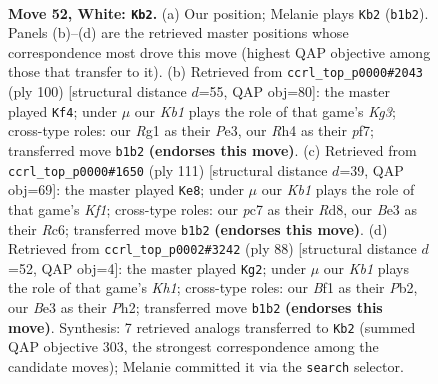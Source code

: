 \documentclass[11pt]{article}
\begin{document}
\clearpage

\begin{figure}[p]\centering
\begin{subfigure}{0.46\textwidth}\centering
\resizebox{\linewidth}{!}{%
\newchessgame
\chessboard[
  setfen={4n3/p1p1k3/8/5p2/r4P1R/4B3/7P/rK3BR1 w - - 8 52},
  showmover=false,
  pgfstyle=straightmove, color=movearrow, markmove={b1-b2}
]}
\caption{}
\end{subfigure}\hfill
\begin{subfigure}{0.46\textwidth}\centering
\resizebox{\linewidth}{!}{%
\newchessgame
\chessboard[
  setfen={1R5R/p4p2/5kp1/8/7P/4PPK1/6rr/8 w - - 5 51},
  showmover=false,
  pgfstyle=straightmove, color=movearrow, markmove={g3-f4}
]}
\caption{}
\end{subfigure}
\\[4pt]
\begin{subfigure}{0.46\textwidth}\centering
\resizebox{\linewidth}{!}{%
\newchessgame
\chessboard[
  setfen={3r1k2/5RR1/2r3pp/P5b1/4p3/6P1/4PPK1/8 b - - 4 56},
  showmover=false,
  pgfstyle=straightmove, color=movearrow, markmove={f8-e8}
]}
\caption{}
\end{subfigure}\hfill
\begin{subfigure}{0.46\textwidth}\centering
\resizebox{\linewidth}{!}{%
\newchessgame
\chessboard[
  setfen={3r4/8/3r4/5pk1/1pBn4/3R4/1P1R3P/7K w - - 2 45},
  showmover=false,
  pgfstyle=straightmove, color=movearrow, markmove={h1-g2}
]}
\caption{}
\end{subfigure}
\caption{\textbf{Move 52, White: \texttt{Kb2}.} (a) Our position; Melanie plays \texttt{Kb2} (\texttt{b1b2}). Panels (b)--(d) are the retrieved master positions whose correspondence most drove this move (highest QAP objective among those that transfer to it). (b) Retrieved from \texttt{ccrl\_top\_p0000\#2043} (ply 100) [structural distance $d$=55, QAP obj=80]: the master played \texttt{Kf4}; under $\mu$ our \emph{Kb1} plays the role of that game's \emph{Kg3}; cross-type roles: our \emph{R}g1 as their \emph{P}e3, our \emph{R}h4 as their \emph{p}f7; transferred move \texttt{b1b2} \textbf{(endorses this move)}. (c) Retrieved from \texttt{ccrl\_top\_p0000\#1650} (ply 111) [structural distance $d$=39, QAP obj=69]: the master played \texttt{Ke8}; under $\mu$ our \emph{Kb1} plays the role of that game's \emph{Kf1}; cross-type roles: our \emph{p}c7 as their \emph{R}d8, our \emph{B}e3 as their \emph{R}c6; transferred move \texttt{b1b2} \textbf{(endorses this move)}. (d) Retrieved from \texttt{ccrl\_top\_p0002\#3242} (ply 88) [structural distance $d$=52, QAP obj=4]: the master played \texttt{Kg2}; under $\mu$ our \emph{Kb1} plays the role of that game's \emph{Kh1}; cross-type roles: our \emph{B}f1 as their \emph{P}b2, our \emph{B}e3 as their \emph{P}h2; transferred move \texttt{b1b2} \textbf{(endorses this move)}. Synthesis: 7 retrieved analogs transferred to \texttt{Kb2} (summed QAP objective 303, the strongest correspondence among the candidate moves); Melanie committed it via the \texttt{search} selector.}
\label{fig:thought-m102}
\end{figure}
\end{document}
